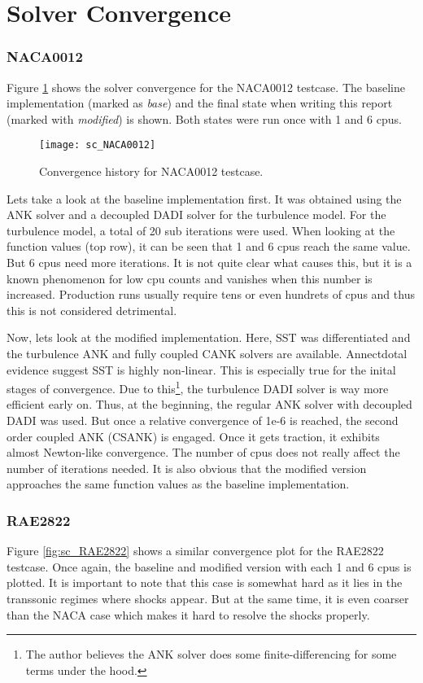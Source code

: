 \section{Solver Convergence}
\subsubsection{NACA0012}
Figure \ref{fig:sc_NACA0012} shows the solver convergence for the NACA0012
testcase. The baseline implementation (marked as \textit{base}) and the final
state when writing this report (marked with \textit{modified}) is shown. Both
states were run once with 1 and 6 cpus.

\begin{figure}[H] \centering
    \texttt{[image: sc\_NACA0012]}
    \caption{Convergence history for NACA0012 testcase.}
    \label{fig:sc_NACA0012}
\end{figure}

\noindent Lets take a look at the baseline implementation first. It was
obtained using the ANK solver and a decoupled DADI solver for the turbulence
model. For the turbulence model, a total of 20 sub iterations were used. When
looking at the function values (top row), it can be seen that 1 and 6 cpus
reach the same value. But 6 cpus need more iterations. It is not quite clear
what causes this, but it is a known phenomenon for low cpu counts and vanishes
when this number is increased. Production runs usually require tens or even
hundrets of cpus and thus this is not considered detrimental.


Now, lets look at the modified implementation. Here, SST was differentiated and
the turbulence ANK and fully coupled CANK solvers are available. Annectdotal
evidence suggest SST is highly non-linear. This is especially true for the
inital stages of convergence. Due to this\footnote{The author believes the ANK
solver does some finite-differencing for some terms under the hood.}, the
turbulence DADI solver is way more efficient early on. Thus, at the beginning,
the regular ANK solver with decoupled DADI was used. But once a relative
convergence of 1e-6 is reached, the second order coupled ANK (CSANK) is
engaged. Once it gets traction, it exhibits almost Newton-like convergence. The
number of cpus does not really affect the number of iterations needed. It is
also obvious that the modified version approaches the same function values as
the baseline implementation. 




\subsubsection{RAE2822}
Figure \ref{fig:sc_RAE2822} shows a similar convergence plot for the RAE2822
testcase. Once again, the baseline and modified version with each 1 and 6 cpus
is plotted. It is important to note that this case is somewhat hard as it lies
in the transsonic regimes where shocks appear. But at the same time, it is even
coarser than the NACA case which makes it hard to resolve the shocks properly.

